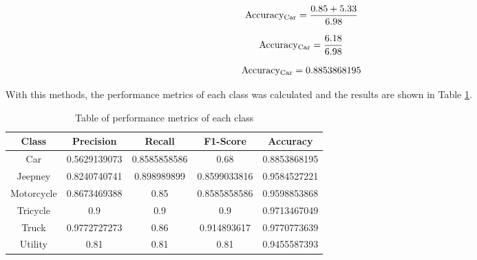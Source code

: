 \[{\text{Accuracy}\textsubscript{Car}}= \frac{0.85 + 5.33}{6.98} \]

\[{\text{Accuracy}\textsubscript{Car}}=  \frac{6.18}{6.98} \]


\[{\text{Accuracy}\textsubscript{Car}}= 0.8853868195 \]


With this methods, the performance metrics of each class was calculated and the results are shown in Table \ref{tab:perf_mat}. 


\begin{table}[ht]   %
	\centering
	\caption{Table of performance metrics of each class} \vspace{0.25em}
	\begin{tabular}{c|c|c|c|c} \hline
		\centering \textbf{Class} & \textbf{Precision} & \textbf{Recall} & \textbf{F1-Score} & \textbf{Accuracy}\\ \hline
		Car & 0.5629139073 & 0.8585858586  & 0.68 & 0.8853868195 \\ \hline
		Jeepney & 0.8240740741 & 0.898989899  & 0.8599033816 & 0.9584527221\\ \hline
		Motorcycle& 0.8673469388  & 0.85   & 0.8585858586 & 0.9598853868 \\ \hline
		Tricycle   & 0.9   & 0.9 & 0.9 & 0.9713467049\\ \hline
		Truck & 0.9772727273 & 0.86 & 0.914893617 & 0.9770773639 \\ \hline
		Utility & 0.81 & 0.81 & 0.81 & 0.9455587393\\ \hline
		
	\end{tabular}
	\label{tab:perf_mat}
\end{table}


